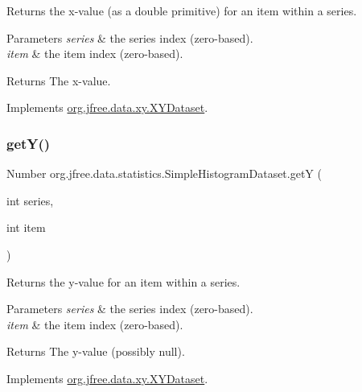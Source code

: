 Returns the x-\/value (as a double primitive) for an item within a series.


\begin{DoxyParams}{Parameters}
{\em series} & the series index (zero-\/based). \\
\hline
{\em item} & the item index (zero-\/based).\\
\hline
\end{DoxyParams}
\begin{DoxyReturn}{Returns}
The x-\/value. 
\end{DoxyReturn}


Implements \mbox{\hyperlink{interfaceorg_1_1jfree_1_1data_1_1xy_1_1_x_y_dataset_a65bd212539d8f7dfb3d3d36b5f42e083}{org.\+jfree.\+data.\+xy.\+X\+Y\+Dataset}}.

\mbox{\label{classorg_1_1jfree_1_1data_1_1statistics_1_1_simple_histogram_dataset_a320b9e6c74edb45fd1c878964a5466c1}} 
\subsubsection{\texorpdfstring{get\+Y()}{getY()}}
{\footnotesize\ttfamily Number org.\+jfree.\+data.\+statistics.\+Simple\+Histogram\+Dataset.\+getY (\begin{DoxyParamCaption}\item[{int}]{series,  }\item[{int}]{item }\end{DoxyParamCaption})}

Returns the y-\/value for an item within a series.


\begin{DoxyParams}{Parameters}
{\em series} & the series index (zero-\/based). \\
\hline
{\em item} & the item index (zero-\/based).\\
\hline
\end{DoxyParams}
\begin{DoxyReturn}{Returns}
The y-\/value (possibly {\ttfamily null}). 
\end{DoxyReturn}


Implements \mbox{\hyperlink{interfaceorg_1_1jfree_1_1data_1_1xy_1_1_x_y_dataset_aa915867221e0f94021bad3140db5254e}{org.\+jfree.\+data.\+xy.\+X\+Y\+Dataset}}.

